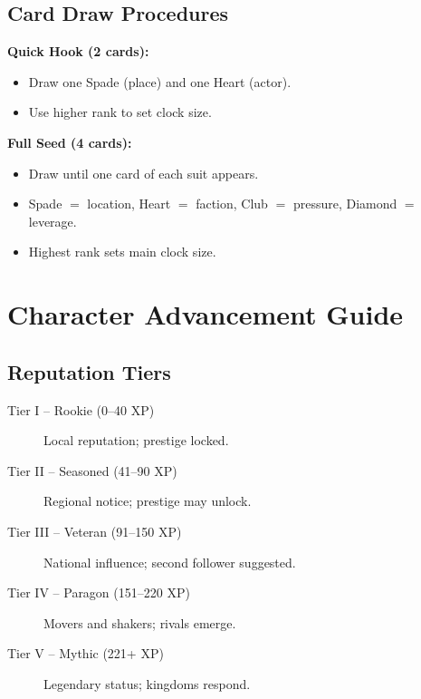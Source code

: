 \subsection{Card Draw Procedures}
\label{subsec:card-draw-ref}

\textbf{Quick Hook (2 cards):}
\begin{itemize}
\item Draw one Spade (place) and one Heart (actor).
\item Use higher rank to set clock size.
\end{itemize}

\textbf{Full Seed (4 cards):}
\begin{itemize}
\item Draw until one card of each suit appears.
\item Spade $=$ location, Heart $=$ faction, Club $=$ pressure, Diamond $=$ leverage.
\item Highest rank sets main clock size.
\end{itemize}

\section{Character Advancement Guide}
\label{sec:advancement-reference}

\subsection{Reputation Tiers}
\label{subsec:reputation-tiers-ref}

\begin{description}
\item[Tier I -- Rookie (0--40 XP)] Local reputation; prestige locked.
\item[Tier II -- Seasoned (41--90 XP)] Regional notice; prestige may unlock.
\item[Tier III -- Veteran (91--150 XP)] National influence; second follower suggested.
\item[Tier IV -- Paragon (151--220 XP)] Movers and shakers; rivals emerge.
\item[Tier V -- Mythic (221+ XP)] Legendary status; kingdoms respond.
\end{description}

